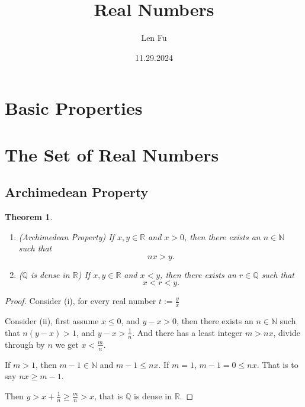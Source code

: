 \documentclass{article}
\title{Real Numbers}
\author{Len Fu}
\date{11.29.2024}
\newtheorem{theorem}{Theorem}[section]
\theoremstyle{definition}
\begin{document}
\maketitle

\begin{abstract}
                                     



\end{abstract}

\tableofcontents

\newpage


\section{Basic Properties}





\section{The Set of Real Numbers}


\subsection{}

\subsection{Archimedean Property}

\begin{theorem}
\begin{enumerate}
    \item (Archimedean Property) If $x,y\in \mathbb{R}$ and $x>0$, then there exists an $n\in \mathbb{N}$ such that $$nx>y.$$
    \item ($\mathbb{Q}$ is dense in $\mathbb{R}$) If $x,y\in \mathbb{R}$ and $x<y$, then there exists an $r\in \mathbb{Q}$ such that $$x<r<y.$$
\end{enumerate}
\end{theorem}

\begin{proof}
    Consider (i), for every real number $t:=\frac{y}{x}$
    
    Consider (ii), first assume $x\leq 0$, and $y-x>0$, then there exists an $n\in \mathbb{N}$ such that $n(y-x)>1$, and $y-x>\frac{1}{n}$.
    And there has a least integer $m>nx$, divide through by $n$ we get $x<\frac{m}{n}$.
    
    If $m>1$, then $m-1\in \mathbb{N}$ and $m-1\leq nx$. If $m=1$, $m-1=0\leq nx$. That is to say $nx\geq m-1.$

    Then $y>x+\frac{1}{n}\geq \frac{m}{n} >x$, that is $\mathbb{Q}$ is dense in $\mathbb{R}$.
\end{proof}
\end{document}
